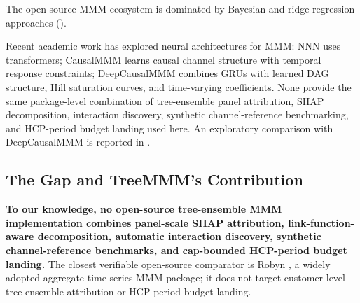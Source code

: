 \documentclass[review,12pt]{elsarticle}
\begin{document}
The open-source MMM ecosystem is dominated by Bayesian and ridge regression
approaches \cite{meridian2024google,pymcmarketing2023}
().

\begin{table}[ht]
\centering
\caption{Open-source MMM tools and their primary limitations.}
\label{tab:existing_tools}
\end{table}

Recent academic work has explored neural architectures for MMM: NNN
\cite{mulc2025nnn} uses transformers; CausalMMM \cite{gong2024causalmmm} learns
causal channel structure with temporal response constraints; DeepCausalMMM
\cite{tirumala2025deepcausalmmm} combines GRUs with learned DAG structure, Hill
saturation curves, and time-varying
coefficients. None provide the same package-level combination of tree-ensemble
panel attribution, SHAP decomposition, interaction discovery, synthetic
channel-reference benchmarking, and HCP-period budget landing used here. An
exploratory comparison with DeepCausalMMM is reported in .

\subsection{The Gap and TreeMMM's Contribution}
\label{sec:intro:gap}

\textbf{To our knowledge, no open-source tree-ensemble MMM implementation combines
panel-scale SHAP attribution, link-function-aware decomposition, automatic
interaction discovery, synthetic channel-reference benchmarks, and cap-bounded
HCP-period budget landing.} The closest verifiable open-source comparator is
Robyn \cite{runge2024robyn}, a widely adopted aggregate time-series MMM package;
it does not target customer-level tree-ensemble attribution or HCP-period budget
landing.
\end{document}
